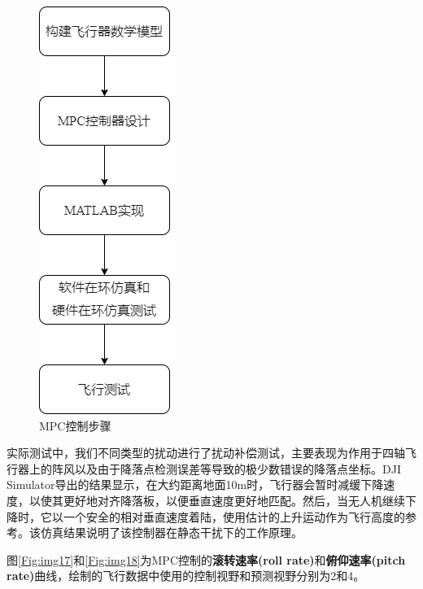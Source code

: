 \begin{figure}[ht]
  \centering
  \includegraphics[width=0.5\linewidth]{./Figure/MPC_Control_Steps.png}
  \caption{MPC控制步骤}\label{Fig:img16_add}
\end{figure}

实际测试中，我们不同类型的扰动进行了扰动补偿测试，主要表现为作用于四轴飞行器上的阵风以及由于降落点检测误差等导致的极少数错误的降落点坐标。\cite{ArtE15}DJI Simulator导出的结果显示，在大约距离地面10m时，飞行器会暂时减缓下降速度，以使其更好地对齐降落板，以便垂直速度更好地匹配。然后，当无人机继续下降时，它以一个安全的相对垂直速度着陆，使用估计的上升运动作为飞行高度的参考。该仿真结果说明了该控制器在静态干扰下的工作原理。

图\ref{Fig:img17}和\ref{Fig:img18}为MPC控制的\textbf{滚转速率(roll rate)}和\textbf{俯仰速率(pitch rate)}曲线，绘制的飞行数据中使用的控制视野和预测视野分别为2和4。

